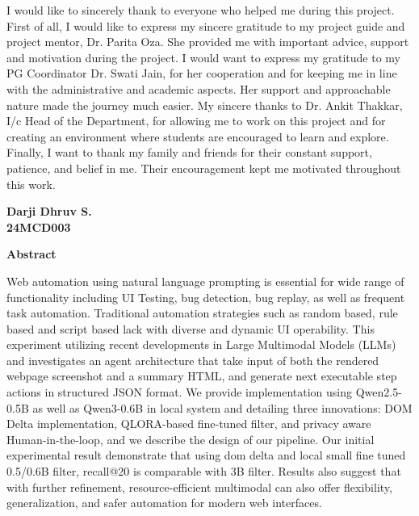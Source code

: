 I would like to sincerely thank to everyone who helped me during this project. First of all, I would like to express my sincere gratitude to my project guide and project mentor, Dr. Parita Oza. She provided me with important advice, support and motivation during the project. I would want to express my gratitude to my PG Coordinator  Dr. Swati Jain, for her cooperation and for keeping me in line with the administrative and academic aspects. Her support and approachable nature made the journey much easier. My sincere thanks to Dr. Ankit Thakkar, I/c Head of the Department, for allowing me to work on this project and for creating an environment where students are encouraged to learn and explore. Finally, I want to thank my family and friends for their constant support, patience, and belief in me. Their encouragement kept me motivated throughout this work.
\\



\begin{flushright}
\textbf{Darji Dhruv S.}\\ \textbf{24MCD003}
\end{flushright}

\newpage
{}
\begin{center}
{\Large \bf Abstract}\\
\end{center}
\vspace{10pt}

Web automation using natural language prompting is essential for wide range of functionality including UI Testing, bug detection, bug replay, as well as frequent task automation. Traditional automation strategies such as random based, rule based and script based lack with diverse and dynamic UI operability. This experiment utilizing recent developments in Large Multimodal Models (LLMs) and investigates an agent architecture that take input of both the rendered webpage screenshot and a summary HTML, and generate next executable step actions in structured JSON format. We provide implementation using Qwen2.5-0.5B as well as Qwen3-0.6B in local system and detailing three innovations: DOM Delta implementation, QLORA-based fine-tuned filter, and privacy aware Human-in-the-loop, and we describe the design of our pipeline. Our initial experimental result demonstrate that using dom delta and local small fine tuned 0.5/0.6B filter, recall@20 is comparable with 3B filter. Results also suggest that with further refinement, resource-efficient multimodal can also offer flexibility, generalization, and safer automation for modern web interfaces. \\




